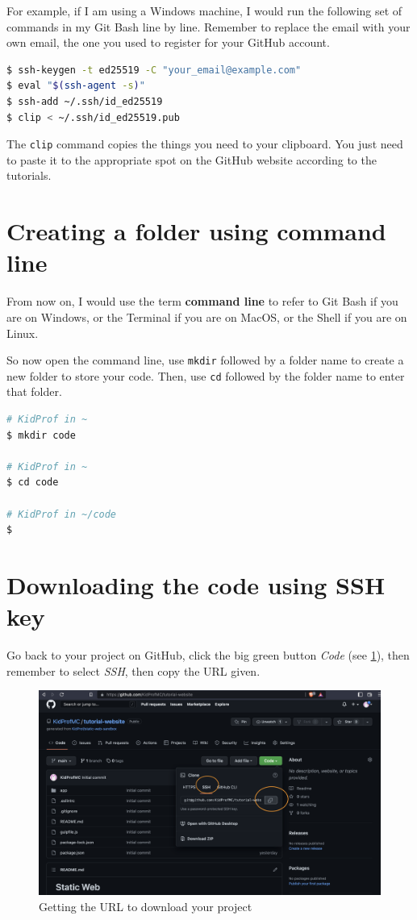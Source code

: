 For example, if I am using a Windows machine, I would run the following set of commands in my Git Bash line by line. Remember to replace the email with your own email, the one you used to register for your GitHub account.

\begin{lstlisting}[language=bash]
$ ssh-keygen -t ed25519 -C "your_email@example.com"
$ eval "$(ssh-agent -s)"
$ ssh-add ~/.ssh/id_ed25519
$ clip < ~/.ssh/id_ed25519.pub
\end{lstlisting}

The \texttt{clip} command copies the things you need to your clipboard. You just need to paste it to the appropriate spot on the GitHub website according to the tutorials.

\section{Creating a folder using command line}
\label{sec:install5}

From now on, I would use the term \textbf{command line} to refer to Git Bash if you are on Windows, or the Terminal if you are on MacOS, or the Shell if you are on Linux. 

So now open the command line, use \texttt{mkdir} followed by a folder name to create a new folder to store your code. Then, use \texttt{cd} followed by the folder name to enter that folder.

\begin{lstlisting}[language=bash]
# KidProf in ~
$ mkdir code

# KidProf in ~
$ cd code

# KidProf in ~/code
$ 
\end{lstlisting}

\section{Downloading the code using SSH key}
\label{sec:install6}

Go back to your project on GitHub, click the big green button \textit{Code} (see \cref{fig:downloadbyssh}), then remember to select \textit{SSH}, then copy the URL given.

\begin{figure}[h]
\centering
\includegraphics[width=15cm]{images/ch1-git-clone.png}
\caption{Getting the URL to download your project}
\label{fig:downloadbyssh}
\end{figure}

